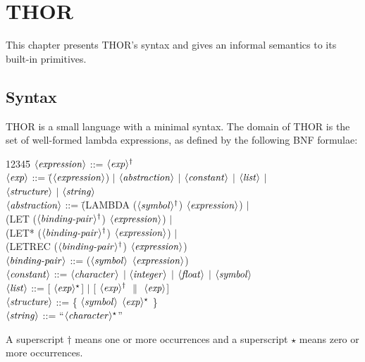 \newcommand{\single}[1]{$\langle{\mbox{\em #1\/}}\rangle$}
\newcommand{\one}[1]{$\langle{\mbox{\em #1\/}}\rangle^\dagger$}
\newcommand{\zero}[1]{$\langle{\mbox{\em #1\/}}\rangle^\star$}
\newcommand{\reds}{$\stackrel{1}{\longrightarrow}$}
\newcommand{\red}{${\longrightarrow}$}


\chapter{THOR}
\label{chapter-THOR}

	This chapter presents THOR's syntax and
gives an informal semantics to its built-in primitives.

\section{Syntax}

	THOR is a small language with a minimal syntax.  The domain 
of THOR is the set of well-formed lambda expressions,
as defined by the following BNF formulae:
\begin{tabbing}
12345\=\kill
\>	\single{expression} ::= \one{exp}\\[.10in]
\>	\single{exp} ::= \= (\single{expression}) $\mid$ \single{abstraction}
				$\mid$ \single{constant} $\mid$ \single{list} $\mid$ \\
\>\>			 \single{structure} $\mid$ \single{string}\\[.10in]
\>	\single{abstraction} ::= \=
		(LAMBDA (\one{symbol}) \single{expression}) $\mid$\\
\>\>		(LET (\one{binding-pair}) \single{expression}) $\mid$\\
\>\>		(LET* (\one{binding-pair}) \single{expression}) $\mid$\\
\>\>		(LETREC (\one{binding-pair}) \single{expression}) \\[.10in]
\>	\single{binding-pair} ::= (\single{symbol} \single{expression})\\[.10in]
\>	\single{constant} ::= \single{character} $\mid$  \single{integer} $\mid$
		 \single{float} $\mid$ \single{symbol}\\[.10in]
\>	\single{list} ::= [ \zero{exp}]
		 $\mid$ [ \one{exp} $\parallel$ \single{exp}]\\ [.10in]
\>	\single{structure} ::= \{ \single{symbol} \zero{exp} \}\\[.10in]
\>	\single{string} ::= ``\zero{character}''\\[.10in]
\end{tabbing}
A superscript $\dagger$ means one or more occurrences and a 
superscript $\star$ means zero or more occurrences.

